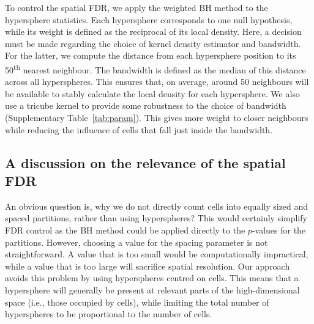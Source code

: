 \documentclass{article}
\begin{document}
To control the spatial FDR, we apply the weighted BH method to the hypersphere statistics.
Each hypersphere corresponds to one null hypothesis, while its weight is defined as the reciprocal of its local density.
Here, a decision must be made regarding the choice of kernel density estimator and bandwidth.
For the latter, we compute the distance from each hypersphere position to its 50\textsuperscript{th} nearest neighbour.
The bandwidth is defined as the median of this distance across all hyperspheres.
This ensures that, on average, around 50 neighbours will be available to stably calculate the local density for each hypersphere.
We also use a tricube kernel to provide some robustness to the choice of bandwidth (Supplementary Table~\ref{tab:param}).
This gives more weight to closer neighbours while reducing the influence of cells that fall just inside the bandwidth.


\subsection{A discussion on the relevance of the spatial FDR}
An obvious question is, why we do not directly count cells into equally sized and spaced partitions, rather than using hyperspheres?
This would certainly simplify FDR control as the BH method could be applied directly to the $p$-values for the partitions.
However, choosing a value for the spacing parameter is not straightforward.
A value that is too small would be computationally impractical, while a value that is too large will sacrifice spatial resolution.
Our approach avoids this problem by using hyperspheres centred on cells.
This means that a hypersphere will generally be present at relevant parts of the high-dimensional space (i.e., those occupied by cells), while limiting the total number of hyperspheres to be proportional to the number of cells.

\end{document}
